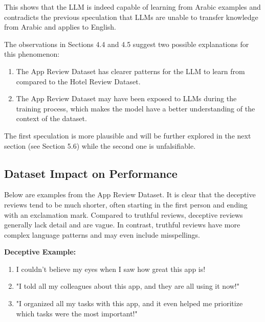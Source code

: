 \documentclass[sigconf, nonacm]{acmart}
\newenvironment{example}
{\begin{mdframed}[
    linecolor=exampleborder,
    linewidth=0.5pt,
    backgroundcolor=examplecolor,
    topline=false,
    bottomline=false,
    leftline=true,
    rightline=false,
    innertopmargin=2pt,
    innerbottommargin=2pt,
    innerleftmargin=5pt,
    innerrightmargin=5pt,
    skipabove=10pt,
    skipbelow=10pt
]}
{\end{mdframed}}
\theoremstyle{definition}
\begin{document}
This shows that the LLM is indeed capable of learning from Arabic examples and contradicts the previous speculation that LLMs are unable to transfer knowledge from Arabic and applies to English.

The observations in Sections 4.4 and 4.5 suggest two possible explanations for this phenomenon:
\begin{enumerate}
  \item The App Review Dataset has clearer patterns for the LLM to learn from compared to the Hotel Review Dataset.
  \item The App Review Dataset may have been exposed to LLMs during the training process, which makes the model have a better understanding of the context of the dataset.
\end{enumerate}

The first speculation is more plausible and will be further explored in the next section (see Section 5.6) while the second one is unfalsifiable.

\subsection{Dataset Impact on Performance}

Below are examples from the App Review Dataset. It is clear that the deceptive reviews tend to be much shorter, often starting in the first person and ending with an exclamation mark. Compared to truthful reviews, deceptive reviews generally lack detail and are vague. In contrast, truthful reviews have more complex language patterns and may even include misspellings.

\begin{example}
  \textbf{Deceptive Example:}
  \begin{enumerate}
    \item I couldn’t believe my eyes when I saw how great this app is!
    \item "I told all my colleagues about this app, and they are all using it now!"
    \item "I organized all my tasks with this app, and it even helped me prioritize which tasks were the most important!"
  \end{enumerate}
\end{example}
\end{document}
